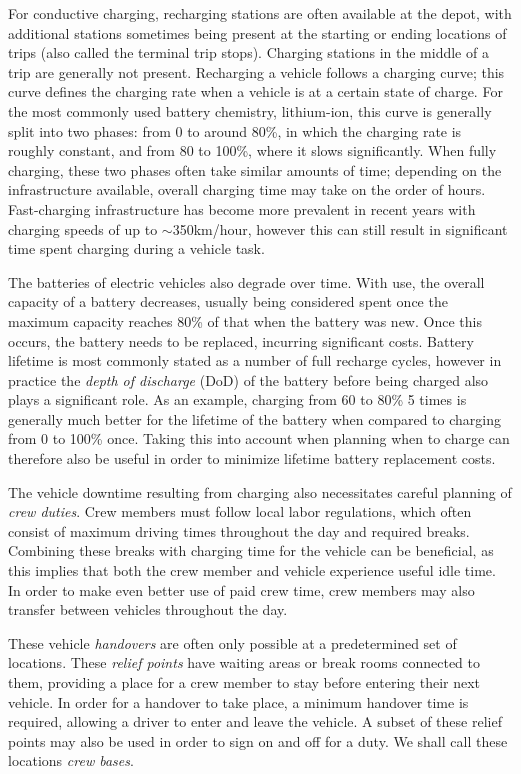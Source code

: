 \documentclass[]{article}
\begin{document}
For conductive charging, recharging stations are often available at the depot, with additional stations sometimes being present at the starting or ending locations of trips (also called the terminal trip stops). Charging stations in the middle of a trip are generally not present. Recharging a vehicle follows a charging curve; this curve defines the charging rate when a vehicle is at a certain state of charge. For the most commonly used battery chemistry, lithium-ion, this curve is generally split into two phases: from 0 to around 80\%, in which the charging rate is roughly constant, and from 80 to 100\%, where it slows significantly. When fully charging, these two phases often take similar amounts of time; depending on the infrastructure available, overall charging time may take on the order of hours. Fast-charging infrastructure has become more prevalent in recent years with charging speeds of up to $\sim$350km/hour, however this can still result in significant time spent charging during a vehicle task.

The batteries of electric vehicles also degrade over time. With use, the overall capacity of a battery decreases, usually being considered spent once the maximum capacity reaches 80\% of that when the battery was new. Once this occurs, the battery needs to be replaced, incurring significant costs. Battery lifetime is most commonly stated as a number of full recharge cycles, however in practice the \emph{depth of discharge} (DoD) of the battery before being charged also plays a significant role. As an example, charging from 60 to 80\% 5 times is generally much better for the lifetime of the battery when compared to charging from 0 to 100\% once. Taking this into account when planning when to charge can therefore also be useful in order to minimize lifetime battery replacement costs.

The vehicle downtime resulting from charging also necessitates careful planning of \emph{crew duties}. Crew members must follow local labor regulations, which often consist of maximum driving times throughout the day and required breaks. Combining these breaks with charging time for the vehicle can be beneficial, as this implies that both the crew member and vehicle experience useful idle time. In order to make even better use of paid crew time, crew members may also transfer between vehicles throughout the day.

These vehicle \emph{handovers} are often only possible at a predetermined set of locations. These \emph{relief points} have waiting areas or break rooms connected to them, providing a place for a crew member to stay before entering their next vehicle. In order for a handover to take place, a minimum handover time is required, allowing a driver to enter and leave the vehicle. A subset of these relief points may also be used in order to sign on and off for a duty. We shall call these locations \emph{crew bases}.  
\end{document}
